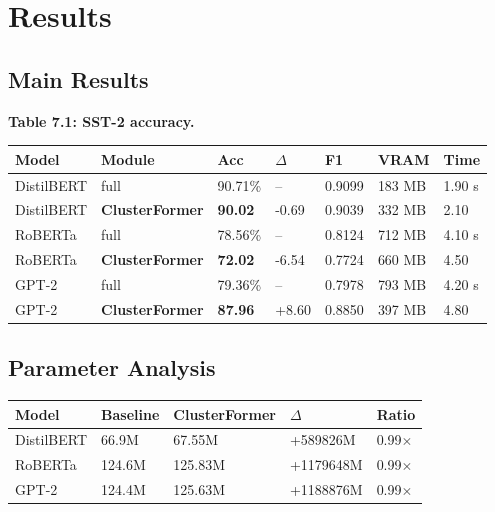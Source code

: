 \section{Results}

\subsection{Main Results}

\textbf{Table 7.1: SST-2 accuracy.}

\begin{table}[H]
\centering
\small
\begin{tabular}{lllllll}
\toprule
\textbf{Model} & \textbf{Module} & \textbf{Acc} & \textbf{$\Delta$} & \textbf{F1} & \textbf{VRAM} & \textbf{Time} \\
\midrule
DistilBERT & full & 90.71\% & -- & 0.9099 & 183 MB & 1.90 s \\
DistilBERT & \textbf{ClusterFormer} & \textbf{90.02} & -0.69 & 0.9039 & 332 MB & 2.10 \\
RoBERTa & full & 78.56\% & -- & 0.8124 & 712 MB & 4.10 s \\
RoBERTa & \textbf{ClusterFormer} & \textbf{72.02} & -6.54 & 0.7724 & 660 MB & 4.50 \\
GPT-2 & full & 79.36\% & -- & 0.7978 & 793 MB & 4.20 s \\
GPT-2 & \textbf{ClusterFormer} & \textbf{87.96} & +8.60 & 0.8850 & 397 MB & 4.80 \\
\bottomrule
\end{tabular}
\end{table}

\subsection{Parameter Analysis}

\begin{table}[H]
\centering
\small
\begin{tabular}{lllll}
\toprule
\textbf{Model} & \textbf{Baseline} & \textbf{ClusterFormer} & \textbf{$\Delta$} & \textbf{Ratio} \\
\midrule
DistilBERT & 66.9M & 67.55M & +589826M & 0.99$\times$ \\
RoBERTa & 124.6M & 125.83M & +1179648M & 0.99$\times$ \\
GPT-2 & 124.4M & 125.63M & +1188876M & 0.99$\times$ \\
\bottomrule
\end{tabular}
\end{table}

